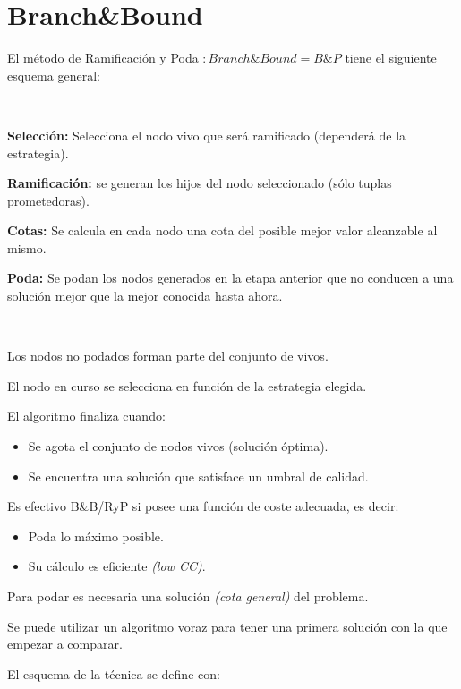 \chapter{Branch\&Bound}
El método de Ramificación y Poda $:Branch\&Bound=B\&P$ tiene el siguiente esquema general:

\begin{theorem}~

	\textbf{Selección:} Selecciona el nodo vivo que será ramificado (dependerá de la estrategia).

	\textbf{Ramificación:} se generan los hijos del nodo seleccionado (sólo tuplas prometedoras).

	\textbf{Cotas:} Se calcula en cada nodo una cota del posible mejor valor alcanzable al mismo.

	\textbf{Poda:} Se podan los nodos generados en la etapa anterior que no conducen a una solución mejor que la mejor conocida hasta ahora.
\end{theorem}

\begin{theorem}~

	Los nodos no podados forman parte del conjunto de vivos.

	El nodo en curso se selecciona en función de la estrategia elegida.

	El algoritmo finaliza cuando:
	\begin{itemize}
		\item Se agota el conjunto de nodos vivos (solución óptima).
		\item Se encuentra una solución que satisface un umbral de calidad.
	\end{itemize}

	Es efectivo B\&B/RyP si posee una función de coste adecuada, es decir:
	\begin{itemize}
		\item Poda lo máximo posible.
		\item Su cálculo es eficiente \textit{(low CC)}.
	\end{itemize}

	Para podar es necesaria una solución \textit{(cota general)} del problema.

	Se puede utilizar un algoritmo voraz para tener una primera solución con la que empezar a comparar.

\end{theorem}

El esquema de la técnica se define con:

